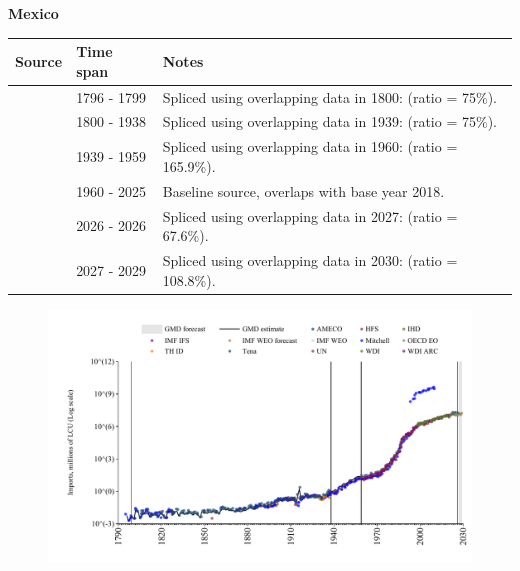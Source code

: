 \documentclass[12pt,a4paper,landscape]{article}
\begin{document}
\begin{adjustbox}{max totalsize={\paperwidth}{\paperheight},center}
\begin{minipage}[t][\textheight][t]{\textwidth}
\vspace*{0.5cm}
{}
\begin{center}
{\Large\bfseries Mexico}
\end{center}
\vspace{0.5cm}
\begin{table}[H]
\centering
\small
\begin{tabular}{|l|l|l|}
\hline
\textbf{Source} & \textbf{Time span} & \textbf{Notes} \\
\hline
\rowcolor{white}\cite{Mitchell}& 1796 - 1799 &Spliced using overlapping data in 1800: (ratio = 75\%).\\
\rowcolor{lightgray}\cite{Tena}& 1800 - 1938 &Spliced using overlapping data in 1939: (ratio = 75\%).\\
\rowcolor{white}\cite{Mitchell}& 1939 - 1959 &Spliced using overlapping data in 1960: (ratio = 165.9\%).\\
\rowcolor{lightgray}\cite{OECD_EO}& 1960 - 2025 &Baseline source, overlaps with base year 2018.\\
\rowcolor{white}\cite{AMECO}& 2026 - 2026 &Spliced using overlapping data in 2027: (ratio = 67.6\%).\\
\rowcolor{lightgray}\cite{IMF_WEO_forecast}& 2027 - 2029 &Spliced using overlapping data in 2030: (ratio = 108.8\%).\\
\hline
\end{tabular}
\end{table}
\begin{figure}[H]
\centering
\includegraphics[width=\textwidth,height=0.6\textheight,keepaspectratio]{graphs/MEX_imports.pdf}
\end{figure}
\end{minipage}
\end{adjustbox}
\end{document}
